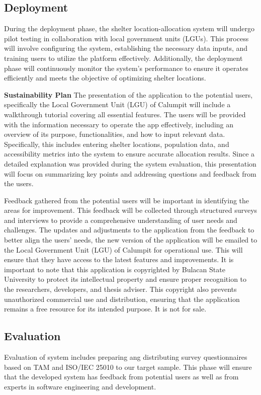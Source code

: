 \subsection{Deployment}
	During the deployment phase, the shelter location-allocation system will undergo pilot testing in collaboration with local government units (LGUs). This process will involve configuring the system, establishing the necessary data inputs, and training users to utilize the platform effectively. Additionally, the deployment phase will continuously monitor the system's performance to ensure it operates efficiently and meets the objective of optimizing shelter locations. 

	\textbf{Sustainability Plan}
	The presentation of the application to the potential users, specifically the Local Government Unit (LGU) of Calumpit will include a walkthrough tutorial covering all essential features. The users will be provided with the information necessary to operate the app effectively, including an overview of its purpose, functionalities, and how to input relevant data. Specifically, this includes entering shelter locations, population data, and accessibility metrics into the system to ensure accurate allocation results. Since a detailed explanation was provided during the system evaluation, this presentation will focus on summarizing key points and addressing questions and feedback from the users.

	Feedback gathered from the potential users will be important in identifying the areas for improvement. This feedback will be collected through structured surveys and interviews to provide a comprehensive understanding of user needs and challenges. The updates and adjustments to the application from the feedback to better align the users’ needs, the new version of the application will be emailed to the Local Government Unit (LGU) of Calumpit for operational use. This will ensure that they have access to the latest features and improvements. It is important to note that this application is copyrighted by Bulacan State University to protect its intellectual property and ensure proper recognition to the researchers, developers, and thesis adviser. This copyright also prevents unauthorized commercial use and distribution, ensuring that the application remains a free resource for its intended purpose. It is not for sale.
	
\subsection{Evaluation}
	Evaluation of system includes preparing ang distributing survey questionnaires based on TAM and ISO/IEC 25010 to our target sample. This phase will ensure that the developed system has feedback from potential users as well as from experts in software engineering and development.

